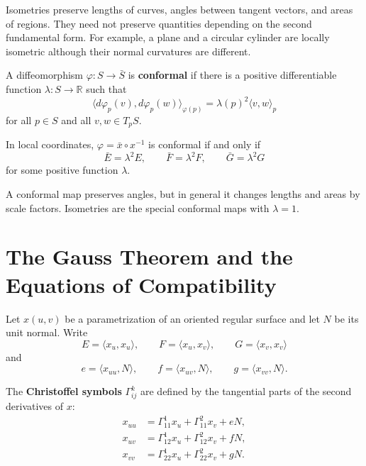 \documentclass[12pt, oneside]{book}
\begin{document}
\begin{remark}
    Isometries preserve lengths of curves, angles between tangent vectors, and
    areas of regions.  They need not preserve quantities depending on the second
    fundamental form.  For example, a plane and a circular cylinder are locally
    isometric although their normal curvatures are different.
\end{remark}

\begin{definition}
    A diffeomorphism $\varphi:S\rightarrow\bar S$ is \textbf{conformal} if
    there is a positive differentiable function $\lambda:S\rightarrow\mathbb{R}$
    such that
    \[
        \langle d\varphi_p(v),d\varphi_p(w)\rangle_{\varphi(p)}
        =
        \lambda(p)^2\langle v,w\rangle_p
    \]
    for all $p\in S$ and all $v,w\in T_pS$.
\end{definition}

\begin{proposition}
    In local coordinates, $\varphi=\bar x\circ x^{-1}$ is conformal if and only
    if
    \[
        \bar E=\lambda^2E,\qquad
        \bar F=\lambda^2F,\qquad
        \bar G=\lambda^2G
    \]
    for some positive function $\lambda$.
\end{proposition}

\begin{remark}
    A conformal map preserves angles, but in general it changes lengths and
    areas by scale factors.  Isometries are the special conformal maps with
    $\lambda=1$.
\end{remark}

\section{The Gauss Theorem and the Equations of Compatibility}

Let $x(u,v)$ be a parametrization of an oriented regular surface and let
$N$ be its unit normal.  Write
\[
    E=\langle x_u,x_u\rangle,\qquad
    F=\langle x_u,x_v\rangle,\qquad
    G=\langle x_v,x_v\rangle
\]
and
\[
    e=\langle x_{uu},N\rangle,\qquad
    f=\langle x_{uv},N\rangle,\qquad
    g=\langle x_{vv},N\rangle .
\]

\begin{definition}
    The \textbf{Christoffel symbols} $\Gamma_{ij}^k$ are defined by the
    tangential parts of the second derivatives of $x$:
    \[
        \begin{aligned}
            x_{uu} & = \Gamma_{11}^1x_u+\Gamma_{11}^2x_v+eN,  \\
            x_{uv} & = \Gamma_{12}^1x_u+\Gamma_{12}^2x_v+fN,  \\
            x_{vv} & = \Gamma_{22}^1x_u+\Gamma_{22}^2x_v+gN .
        \end{aligned}
    \]
\end{definition}
\end{document}
